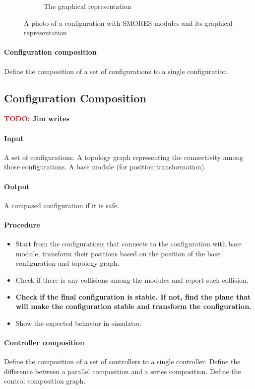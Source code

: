 \documentclass[conference]{IEEEtran}
\theoremstyle{definition}
\newcommand{\TODO}[1]{ {\bf \textcolor{red}{TODO:} #1 }}
\begin{document}
\begin{figure}
\begin{center}
\begin{subfigure}[b]{0.4\columnwidth}
                \caption{The graphical representation}
                \label{fig:smores_conf_graph}
        \end{subfigure}
\end{center}
\caption{A photo of a configuration with SMORES modules and its graphical representation}
\label{fig:smores_conf}
\end{figure}


\paragraph{Configuration composition}
Define the composition of a set of configurations to a single configuration.

\subsection{Configuration Composition}
\TODO{Jim writes}
\paragraph{Input}
A set of configurations. A topology graph representing the connectivity among those configurations. A base module (for position transformation).
\paragraph{Output}
A composed configuration if it is safe.
\paragraph{Procedure}
\begin{itemize}
\item Start from the configurations that connects to the configuration with base module, transform their positions based on the position of the base configuration and topology graph.
\item Check if there is any collisions among the modules and report such collision.
\item \textbf{Check if the final configuration is stable. If not, find the plane that will make the configuration stable and transform the configuration.}
\item Show the expected behavior in simulator.
\end{itemize}

\paragraph{Controller composition}
Define the composition of a set of controllers to a single controller. Define the difference between a parallel composition and a series composition. Define the control composition graph.
\end{document}
